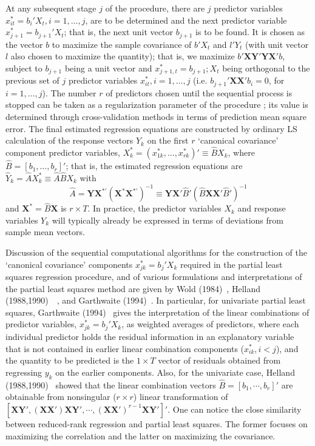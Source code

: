 At any subsequent stage $j$ of the procedure, there are $j$ predictor variables $x_{it}^*= b_i' X_t, i=1,\ldots, j$, are to be determined and the next predictor variable $x_{j+1}^*= b_{j+1}'X_t$; that is, the next unit vector $b_{j+1}$ is to be found. It is chosen as the vector $b$ to maximize the sample covariance of $b'X_t$ and $l' Y_t$ (with unit vector $l$ also chosen to maximize the quantity); that is, we maximize $b' \mathbf{XY'YX'}b$, subject to $b_{j+1}$ being a unit vector and $x_{j+1,t}^*=b_{j+1}; X_t$ being orthogonal to the previous set of $j$ predictor variables $x_{it}^*, i=1,\ldots,j$ (i.e. $b_{j+1}' \mathbf{XX'} b_i=0$, for $i=1,\ldots,j$). The number $r$ of predictors chosen until the sequential process is stopped can be taken as a regularization parameter of the procedure ; its value is determined through cross-validation methods in terms of prediction mean square error. The final estimated regression equations are constructed by ordinary LS calculation of the response vectors $Y_k$ on the first $r$ `canonical covariance' component predictor variables, $X_k^*= (x_{1k}^*,\ldots,x_{rk}^*)' \equiv \hat{B} X_k$, where $\hat{B}=[b_1,\ldots,b_r]'$; that is, the estimated regression equations are $\hat{Y}_k= \hat{A}X_k^* \equiv \hat{A}\hat{B} X_k$ with
	\[
	\hat{A}=\mathbf{YX}^{*'} (\mathbf{X}^* \mathbf{X}^{*'})^{-1} \equiv \mathbf{YX'} \hat{B}' (\hat{B} \mathbf{XX'} \hat{B}')^{-1}
	\]
and $\mathbf{X}^*=\hat{B}\mathbf{X}$ is $r \times T$. In practice, the predictor variables $X_k$ and response variables $Y_k$ will typically already be expressed in terms of deviations from sample mean vectors.


Discussion of the sequential computational algorithms for the construction of the `canonical covariance' components $x_{jk}^*=b_j'X_k$ required in the partial least squares regression procedure, and of various formulations and interpretations of the partial least squares method are given by Wold (1984)~\cite{wold}, Helland (1988,1990)~\cite{helland88}~\cite{helland90}, and Garthwaite (1994)~\cite{garth}. In particular, for univariate partial least squares, Garthwaite (1994)~\cite{garth} gives the interpretation of the linear combinations of predictor variables, $x_{jk}^*=b_j'X_k$, as weighted averages of predictors, where each individual predictor holds the residual information in an explanatory variable that is not contained in earlier linear combination components ($x_{ik}^*, i<j$), and the quantity to be predicted is the $1 \times T$ vector of residuals obtained from regressing $y_k$ on the earlier components. Also, for the univariate case, Helland (1988,1990)~\cite{helland88,helland90} showed that the linear combination vectors $\hat{B}=[b_1,\cdots,b_r]'$ are obtainable from nonsingular ($r \times r$) linear transformation of $[\mathbf{XY'},  (\mathbf{XX'})\mathbf{XY'}, \cdots, (\mathbf{XX'})^{r-1} \mathbf{XY'}]'$. One can notice the close similarity between reduced-rank regression and partial least squares. The former focuses on maximizing the correlation and the latter on maximizing the covariance.



